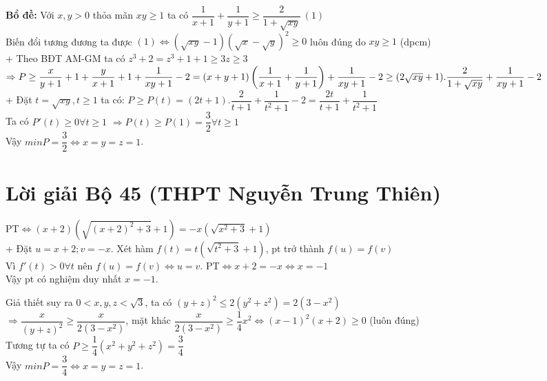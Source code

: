 \hda 
\textbf{Bổ đề:} Với $x,y>0$ thỏa mãn $xy\ge 1$ ta có $\dfrac{1}{x+1}+\dfrac{1}{y+1}\ge \dfrac{2}{1+\sqrt{xy}}~(1)$\\
Biến đổi tương đương ta được $(1)\iff (\sqrt{xy}-1)(\sqrt{x}-\sqrt{y})^2\ge 0$ luôn đúng do $xy\ge 1$ (dpcm)\\
+ Theo BĐT AM-GM ta có $z^3+2=z^3+1+1\ge 3z\ge 3$\\
$\Rightarrow P\ge \dfrac{x}{y+1}+1+\dfrac{y}{x+1}+1+\dfrac{1}{xy+1}-2\\
=(x+y+1)\left(\dfrac{1}{x+1}+\dfrac{1}{y+1}\right)+\dfrac{1}{xy+1}-2\ge (2\sqrt{xy}+1).\dfrac{2}{1+\sqrt{xy}}+\dfrac{1}{xy+1}-2$\\
+ Đặt $t=\sqrt{xy}, t\ge 1$ ta có:
$P\ge P(t)=(2t+1).\dfrac{2}{t+1}+\dfrac{1}{t^2+1}-2=\dfrac{2t}{t+1}+\dfrac{1}{t^2+1}$\\
Ta có $P'(t)\ge 0 \forall t\ge 1$
$\Rightarrow P(t)\ge P(1)=\dfrac{3}{2}\forall t\ge 1$\\
Vậy $minP=\dfrac{3}{2}\iff x=y=z=1$.

\section{Lời giải Bộ 45 (THPT Nguyễn Trung Thiên)}

\lgi 
\vspace{5cm}

\hda 
PT$\iff(x+2)\left(\sqrt{(x+2)^2+3}+1\right) =-x\left(\sqrt{x^2+3}+1\right)$\\
+ Đặt $u=x+2;v=-x$.
Xét hàm $f(t)=t\left(\sqrt{t^2+3}+1\right)$, pt trở thành $f(u)=f(v)$\\
Vì $f'(t)>0\forall t$ nên $f(u)=f(v)\iff u=v$.
PT$\iff x+2=-x\iff x=-1$\\
Vậy pt có nghiệm duy nhất $x=-1$.

\hda 
Giả thiết suy ra $0<x,y,z<\sqrt{3}$, ta có $(y+z)^2\le 2(y^2+z^2)=2(3-x^2)$\\
$\Rightarrow \dfrac{x}{(y+z)^2}\ge \dfrac{x}{2(3-x^2)}$, mặt khác $\dfrac{x}{2(3-x^2)}\ge \dfrac{1}{4}x^2\iff (x-1)^2(x+2)\ge 0$ (luôn đúng)\\
Tương tự ta có $P\ge \dfrac{1}{4}(x^2+y^2+z^2)=\dfrac{3}{4}$\\
Vậy $minP=\dfrac{3}{4}\iff x=y=z=1$.
